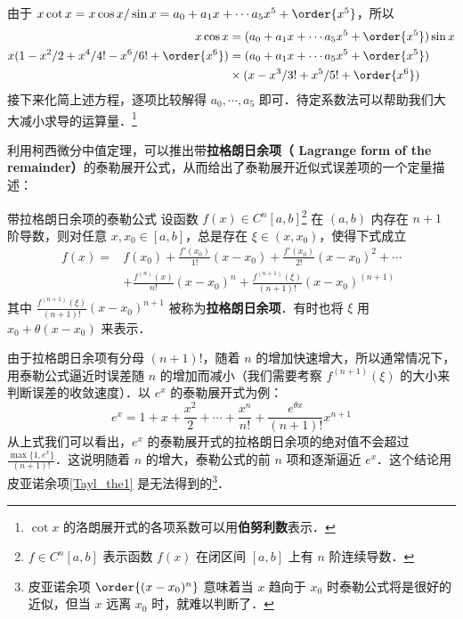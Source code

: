 由于 $x\cot x=x\cos x/\sin x=a_0+a_1 x+\cdots a_5 x^5+\order{x^5}$，所以
\begin{equation}
\begin{aligned}
x\cos x&=(a_0+a_1 x+\cdots a_5 x^5+\order{x^5})\sin x\\
x(1-x^2/2+x^4/4!-x^6/6!+\order{x^6})&=(a_0+a_1 x+\cdots a_5 x^5+\order{x^5})\\
&\times (x-x^3/3!+x^5/5!+\order{x^6})
\end{aligned}
\end{equation}
接下来化简上述方程，逐项比较解得 $a_0,\cdots,a_5$ 即可．待定系数法可以帮助我们大大减小求导的运算量．\footnote{$\cot x$ 的洛朗展开式的各项系数可以用\textbf{伯努利数}表示．}

利用柯西微分中值定理，可以推出带\textbf{拉格朗日余项（ Lagrange form of the remainder）}的泰勒展开公式，从而给出了泰勒展开近似式误差项的一个定量描述：
\begin{theorem}{带拉格朗日余项的泰勒公式}
设函数 $f(x)\in C^n[a,b]$\footnote{$f\in C^n[a,b]$ 表示函数 $f(x)$ 在闭区间 $[a,b]$ 上有 $n$ 阶连续导数．} 在 $(a,b)$ 内存在 $n+1$ 阶导数，则对任意 $x,x_0\in [a,b]$，总是存在 $\xi\in (x,x_0)$，使得下式成立
\begin{equation}\label{Tayl_eq3}
\begin{aligned}
f(x)=&f(x_0)+\frac{f'(x_0)}{1!}(x-x_0)+\frac{f'(x_0)}{2!}(x-x_0)^2+\cdots\\
&+\frac{f^{(n)}(x)}{n!}(x-x_0)^n+\frac{f^{(n+1)}(\xi)}{(n+1)!}(x-x_0)^{(n+1)}
\end{aligned}
\end{equation}
其中 $\frac{f^{(n+1)}(\xi)}{(n+1)!}(x-x_0)^{n+1}$ 被称为\textbf{拉格朗日余项}．有时也将 $\xi$ 用 $x_0+\theta(x-x_0)$ 来表示．
\end{theorem}

由于拉格朗日余项有分母 $(n+1)!$，随着 $n$ 的增加快速增大，所以通常情况下，用泰勒公式逼近时误差随 $n$ 的增加而减小（我们需要考察 $f^{(n+1)}(\xi)$ 的大小来判断误差的收敛速度）．以 $e^x$ 的泰勒展开式为例：
\begin{equation}
e^x=1+x+\frac{x^2}{2}+\cdots+\frac{x^n}{n!}+\frac{e^{\theta x}}{(n+1)!}x^{n+1}
\end{equation}
从上式我们可以看出，$e^x$ 的泰勒展开式的拉格朗日余项的绝对值不会超过 $\frac{\max\{1,e^x\}}{(n+1)!}$．这说明随着 $n$ 的增大，泰勒公式的前 $n$ 项和逐渐逼近 $e^x$．这个结论用皮亚诺余项\autoref{Tayl_the1} 是无法得到的\footnote{皮亚诺余项 $\order{(x-x_0)^n}$ 意味着当 $x$ 趋向于 $x_0$ 时泰勒公式将是很好的近似，但当 $x$ 远离 $x_0$ 时，就难以判断了．}．

